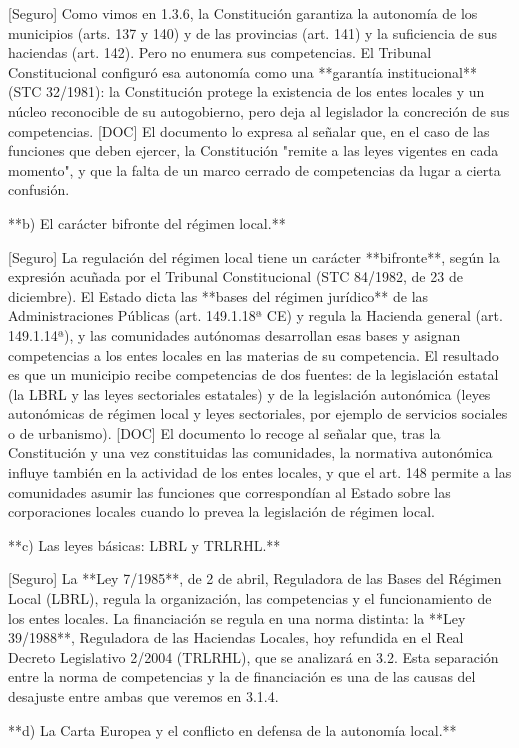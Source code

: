 \documentclass[10pt,a4paper]{article}
\begin{document}
[Seguro] Como vimos en 1.3.6, la Constitución garantiza la autonomía de los municipios (arts. 137 y 140) y de las provincias (art. 141) y la suficiencia de sus haciendas (art. 142). Pero no enumera sus competencias. El Tribunal Constitucional configuró esa autonomía como una **garantía institucional** (STC 32/1981): la Constitución protege la existencia de los entes locales y un núcleo reconocible de su autogobierno, pero deja al legislador la concreción de sus competencias. [DOC] El documento lo expresa al señalar que, en el caso de las funciones que deben ejercer, la Constitución "remite a las leyes vigentes en cada momento", y que la falta de un marco cerrado de competencias da lugar a cierta confusión.

**b) El carácter bifronte del régimen local.**

[Seguro] La regulación del régimen local tiene un carácter **bifronte**, según la expresión acuñada por el Tribunal Constitucional (STC 84/1982, de 23 de diciembre). El Estado dicta las **bases del régimen jurídico** de las Administraciones Públicas (art. 149.1.18ª CE) y regula la Hacienda general (art. 149.1.14ª), y las comunidades autónomas desarrollan esas bases y asignan competencias a los entes locales en las materias de su competencia. El resultado es que un municipio recibe competencias de dos fuentes: de la legislación estatal (la LBRL y las leyes sectoriales estatales) y de la legislación autonómica (leyes autonómicas de régimen local y leyes sectoriales, por ejemplo de servicios sociales o de urbanismo). [DOC] El documento lo recoge al señalar que, tras la Constitución y una vez constituidas las comunidades, la normativa autonómica influye también en la actividad de los entes locales, y que el art. 148 permite a las comunidades asumir las funciones que correspondían al Estado sobre las corporaciones locales cuando lo prevea la legislación de régimen local.

**c) Las leyes básicas: LBRL y TRLRHL.**

[Seguro] La **Ley 7/1985**, de 2 de abril, Reguladora de las Bases del Régimen Local (LBRL), regula la organización, las competencias y el funcionamiento de los entes locales. La financiación se regula en una norma distinta: la **Ley 39/1988**, Reguladora de las Haciendas Locales, hoy refundida en el Real Decreto Legislativo 2/2004 (TRLRHL), que se analizará en 3.2. Esta separación entre la norma de competencias y la de financiación es una de las causas del desajuste entre ambas que veremos en 3.1.4.

**d) La Carta Europea y el conflicto en defensa de la autonomía local.**
\end{document}
